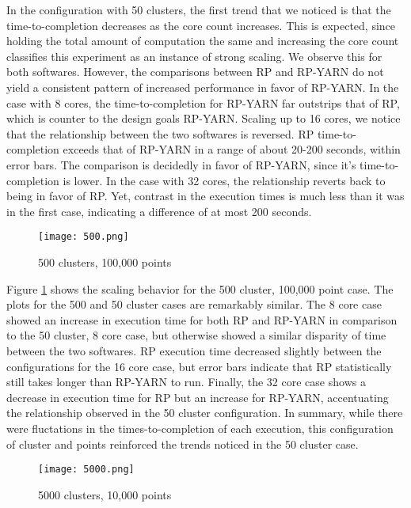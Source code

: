 \documentclass[]{article}
\begin{document}
			In the configuration with 50 clusters, the first trend that we noticed is that the time-to-completion decreases as the core count increases. This is expected, since holding the total amount of computation the same and increasing the core count classifies this experiment as an instance of strong scaling. We observe this for both softwares. However, the comparisons between RP and RP-YARN do not yield a consistent pattern of increased performance in favor of RP-YARN. In the case with 8 cores, the time-to-completion for RP-YARN far outstrips that of RP, which is counter to the design goals RP-YARN. Scaling up to 16 cores, we notice that the relationship between the two softwares is reversed. RP time-to-completion exceeds that of RP-YARN in a range of about 20-200 seconds, within error bars. The comparison is decidedly in favor of RP-YARN, since it's time-to-completion is lower. In the case with 32 cores, the relationship reverts back to being in favor of RP. Yet, contrast in the execution times is much less than it was in the first case, indicating a difference of at most 200 seconds.

			\begin{figure}[H]
				\centering
				\texttt{[image: 500.png]}
				\caption{500 clusters, 100,000 points}
				\label{fig:500}
			\end{figure}

			Figure \ref{fig:500} shows the scaling behavior for the 500 cluster, 100,000 point case. The plots for the 500 and 50 cluster cases are remarkably similar. The 8 core case showed an increase in execution time for both RP and RP-YARN in comparison to the 50 cluster, 8 core case, but otherwise showed a similar disparity of time between the two softwares. RP execution time decreased slightly between the configurations for the 16 core case, but error bars indicate that RP statistically still takes longer than RP-YARN to run. Finally, the 32 core case shows a decrease in execution time for RP but an increase for RP-YARN, accentuating the relationship observed in the 50 cluster configuration. In summary, while there were fluctations in the times-to-completion of each execution, this configuration of cluster and points reinforced the trends noticed in the 50 cluster case. 

			\begin{figure}[H]
				\centering
				\texttt{[image: 5000.png]}
				\caption{5000 clusters, 10,000 points}
				\label{fig:5000}
			\end{figure}
\end{document}
